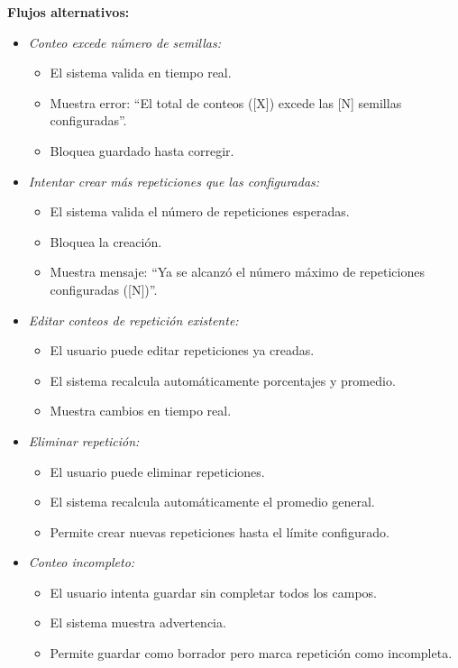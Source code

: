 \vspace{0.5em}
\noindent\textbf{Flujos alternativos:}
\begin{itemize}[nosep]
    \item \textit{Conteo excede número de semillas:}
    \begin{itemize}[nosep]
        \item El sistema valida en tiempo real.
        \item Muestra error: ``El total de conteos ([X]) excede las [N] semillas configuradas''.
        \item Bloquea guardado hasta corregir.
    \end{itemize}

    \item \textit{Intentar crear más repeticiones que las configuradas:}
    \begin{itemize}[nosep]
        \item El sistema valida el número de repeticiones esperadas.
        \item Bloquea la creación.
        \item Muestra mensaje: ``Ya se alcanzó el número máximo de repeticiones configuradas ([N])''.
    \end{itemize}

    \item \textit{Editar conteos de repetición existente:}
    \begin{itemize}[nosep]
        \item El usuario puede editar repeticiones ya creadas.
        \item El sistema recalcula automáticamente porcentajes y promedio.
        \item Muestra cambios en tiempo real.
    \end{itemize}

    \item \textit{Eliminar repetición:}
    \begin{itemize}[nosep]
        \item El usuario puede eliminar repeticiones.
        \item El sistema recalcula automáticamente el promedio general.
        \item Permite crear nuevas repeticiones hasta el límite configurado.
    \end{itemize}

    \item \textit{Conteo incompleto:}
    \begin{itemize}[nosep]
        \item El usuario intenta guardar sin completar todos los campos.
        \item El sistema muestra advertencia.
        \item Permite guardar como borrador pero marca repetición como incompleta.
    \end{itemize}
\end{itemize}

